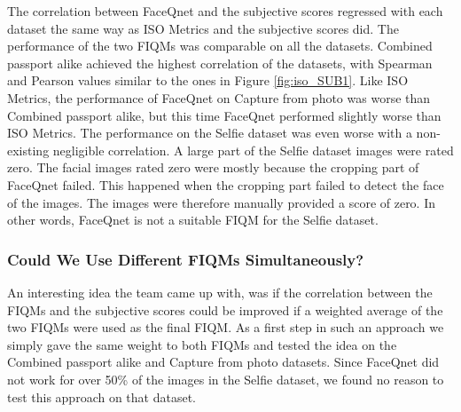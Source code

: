\noindent
The correlation between FaceQnet and the subjective scores regressed with each dataset the same way as ISO Metrics and the subjective scores did. The performance of the two FIQMs was comparable on all the datasets. Combined passport alike achieved the highest correlation of the datasets, with Spearman and Pearson values similar to the ones in Figure \ref{fig:iso_SUB1}. Like ISO Metrics, the performance of FaceQnet on Capture from photo was worse than Combined passport alike, but this time FaceQnet performed slightly worse than ISO Metrics. The performance on the Selfie dataset was even worse with a non-existing negligible correlation. A large part of the Selfie dataset images were rated zero. The facial images rated zero were mostly because the cropping part of FaceQnet failed. This happened when the cropping part failed to detect the face of the images. The images were therefore manually provided a score of zero. In other words, FaceQnet is not a suitable FIQM for the Selfie dataset. 

\subsubsection{Could We Use Different FIQMs Simultaneously?}
An interesting idea the team came up with, was if the correlation between the FIQMs and the subjective scores could be improved if a weighted average of the two FIQMs were used as the final FIQM. As a first step in such an approach we simply gave the same weight to both FIQMs and tested the idea on the Combined passport alike and Capture from photo datasets. Since FaceQnet did not work for over 50\% of the images in the Selfie dataset, we found no reason to test this approach on that dataset. 

